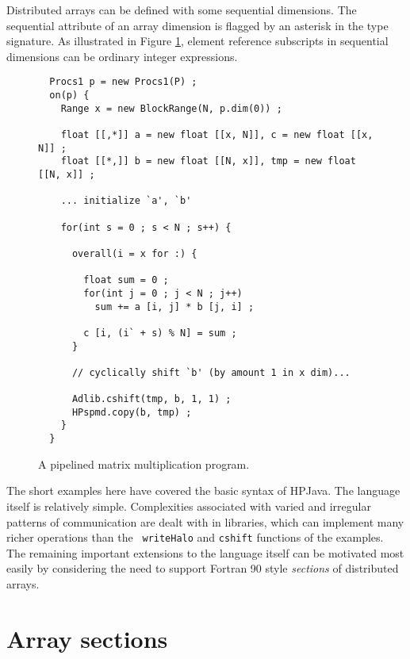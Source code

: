 \documentclass{article}
\begin{document}
Distributed arrays can be defined with some sequential dimensions.  The
sequential attribute of an array dimension is flagged by an asterisk in
the type signature.  As illustrated in Figure \ref{fig:pipedMatmul},
element reference subscripts in sequential dimensions can be ordinary
integer expressions.


\begin{figure}[tbp]
\small
\begin{verbatim}
  Procs1 p = new Procs1(P) ;
  on(p) {
    Range x = new BlockRange(N, p.dim(0)) ;

    float [[,*]] a = new float [[x, N]], c = new float [[x, N]] ;
    float [[*,]] b = new float [[N, x]], tmp = new float [[N, x]] ;

    ... initialize `a', `b'

    for(int s = 0 ; s < N ; s++) {

      overall(i = x for :) {

        float sum = 0 ;
        for(int j = 0 ; j < N ; j++)
          sum += a [i, j] * b [j, i] ;

        c [i, (i` + s) % N] = sum ;
      }

      // cyclically shift `b' (by amount 1 in x dim)...

      Adlib.cshift(tmp, b, 1, 1) ;
      HPspmd.copy(b, tmp) ;
    }
  }
\end{verbatim}
\normalsize
\caption{A pipelined matrix multiplication program.\label{fig:pipedMatmul}}
\end{figure}


The short examples here have covered the basic syntax of HPJava.  The
language itself is relatively simple.  Complexities associated with
varied and irregular patterns of communication are dealt with in
libraries, which can implement many richer operations than the {\tt
writeHalo} and {\tt cshift} functions of the examples.  The remaining
important extensions to the language itself can be motivated most
easily by considering the need to support Fortran 90 style {\em
sections} of distributed arrays.

\section{Array sections\label{sec:sections}}

\end{document}
